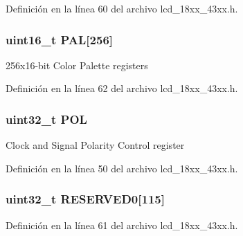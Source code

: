 Definición en la línea 60 del archivo lcd\+\_\+18xx\+\_\+43xx.\+h.

\subsubsection[{\texorpdfstring{P\+AL}{PAL}}]{ uint16\+\_\+t P\+AL\mbox{[}256\mbox{]}}\hypertarget{struct_l_p_c___l_c_d___t_ae68b7ee8bf7bbe3927b79cbf7849b4c3}{}\label{struct_l_p_c___l_c_d___t_ae68b7ee8bf7bbe3927b79cbf7849b4c3}
256x16-\/bit Color Palette registers 

Definición en la línea 62 del archivo lcd\+\_\+18xx\+\_\+43xx.\+h.

\subsubsection[{\texorpdfstring{P\+OL}{POL}}]{ uint32\+\_\+t P\+OL}\hypertarget{struct_l_p_c___l_c_d___t_a9037a11797290aef4ac48048c07e2e89}{}\label{struct_l_p_c___l_c_d___t_a9037a11797290aef4ac48048c07e2e89}
Clock and Signal Polarity Control register 

Definición en la línea 50 del archivo lcd\+\_\+18xx\+\_\+43xx.\+h.

\subsubsection[{\texorpdfstring{R\+E\+S\+E\+R\+V\+E\+D0}{RESERVED0}}]{ uint32\+\_\+t R\+E\+S\+E\+R\+V\+E\+D0\mbox{[}115\mbox{]}}\hypertarget{struct_l_p_c___l_c_d___t_afe2af632cea587115bb9320bbed7294a}{}\label{struct_l_p_c___l_c_d___t_afe2af632cea587115bb9320bbed7294a}


Definición en la línea 61 del archivo lcd\+\_\+18xx\+\_\+43xx.\+h.

